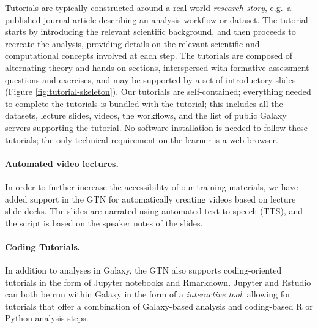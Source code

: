 \documentclass[10pt,letterpaper]{article}
\begin{document}
Tutorials are typically constructed around a real-world \emph{research story}, e.g.\ a published journal article describing an analysis workflow or dataset. 
The tutorial starts by introducing the relevant scientific background, and then proceeds to recreate the analysis, providing details on the relevant scientific and computational concepts involved at each step. The tutorials are composed of alternating theory and hands-on sections, interspersed with formative assessment questions and exercises, and may be supported by a set of introductory slides (Figure \ref{fig:tutorial-skeleton}). Our tutorials are self-contained; everything needed to complete the tutorials is bundled with the tutorial; this includes all the datasets, lecture slides, videos, the workflows, and the list of public Galaxy servers supporting the tutorial. No software installation is needed to follow these tutorials; the only technical requirement on the learner is a web browser.

\paragraph{Automated video lectures.} In order to further increase the accessibility of our training materials, we have added support in the GTN for automatically creating videos based on lecture slide decks. The slides are narrated using automated text-to-speech (TTS), and the script is based on the speaker notes of the slides. 

\paragraph{Coding Tutorials.} In addition to analyses in Galaxy, the GTN also supports coding-oriented tutorials in the form of Jupyter notebooks and Rmarkdown. Jupyter and Rstudio can both be run within Galaxy in the form of a \emph{interactive tool}, allowing for tutorials that offer a combination of Galaxy-based analysis and coding-based R or Python analysis steps. 
\end{document}
